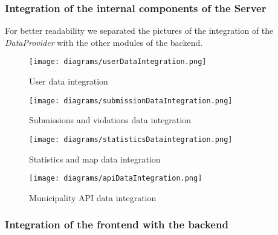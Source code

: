         \subsubsection{Integration of the internal components of the Server}
            
            For better readability we separated the pictures of the integration of the \emph{DataProvider} with the other modules of the backend.\\

            \begin{figure}[h]
                \centering
                \texttt{[image: diagrams/userDataIntegration.png]}
                \caption{
                    \label{fig:userDataIntegration} 
                    User data integration
                }
            \end{figure}
            
            \begin{figure}[h]
                \centering
                \texttt{[image: diagrams/submissionDataIntegration.png]}
                \caption{
                    \label{fig:submissionDataIntegration} 
                    Submissions and violations data integration
                }
            \end{figure}
            
            \begin{figure}[h]
                \centering
                \texttt{[image: diagrams/statisticsDataintegration.png]}
                \caption{
                    \label{fig:statisticsDataIntegration} 
                    Statistics and map data integration
                }
            \end{figure}
             
            \begin{figure}[h]
                \centering
                \texttt{[image: diagrams/apiDataIntegration.png]}
                \caption{
                    \label{fig:apiDataIntegration} 
                    Municipality API data integration
                }
            \end{figure}

        \subsubsection{Integration of the frontend with the backend}
            

